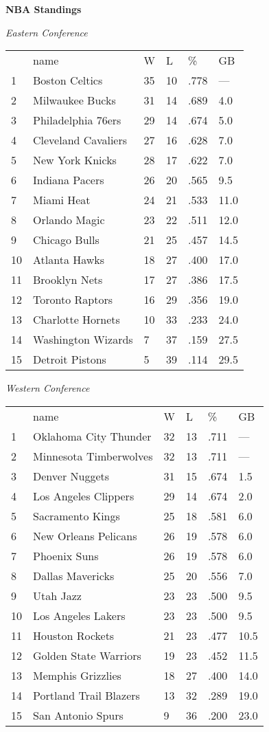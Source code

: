 \textbf{NBA Standings}

\textit{Eastern Conference}
\begin{tabular}{llllll}
 & name & W & L & \% & GB \\
1 & Boston Celtics & 35 & 10 & .778 & — \\
2 & Milwaukee Bucks & 31 & 14 & .689 & 4.0 \\
3 & Philadelphia 76ers & 29 & 14 & .674 & 5.0 \\
4 & Cleveland Cavaliers & 27 & 16 & .628 & 7.0 \\
5 & New York Knicks & 28 & 17 & .622 & 7.0 \\
6 & Indiana Pacers & 26 & 20 & .565 & 9.5 \\
7 & Miami Heat & 24 & 21 & .533 & 11.0 \\
8 & Orlando Magic & 23 & 22 & .511 & 12.0 \\
9 & Chicago Bulls & 21 & 25 & .457 & 14.5 \\
10 & Atlanta Hawks & 18 & 27 & .400 & 17.0 \\
11 & Brooklyn Nets & 17 & 27 & .386 & 17.5 \\
12 & Toronto Raptors & 16 & 29 & .356 & 19.0 \\
13 & Charlotte Hornets & 10 & 33 & .233 & 24.0 \\
14 & Washington Wizards & 7 & 37 & .159 & 27.5 \\
15 & Detroit Pistons & 5 & 39 & .114 & 29.5 \\
\end{tabular}


\textit{Western Conference}
\begin{tabular}{llllll}
 & name & W & L & \% & GB \\
1 & Oklahoma City Thunder & 32 & 13 & .711 & — \\
2 & Minnesota Timberwolves & 32 & 13 & .711 & — \\
3 & Denver Nuggets & 31 & 15 & .674 & 1.5 \\
4 & Los Angeles Clippers & 29 & 14 & .674 & 2.0 \\
5 & Sacramento Kings & 25 & 18 & .581 & 6.0 \\
6 & New Orleans Pelicans & 26 & 19 & .578 & 6.0 \\
7 & Phoenix Suns & 26 & 19 & .578 & 6.0 \\
8 & Dallas Mavericks & 25 & 20 & .556 & 7.0 \\
9 & Utah Jazz & 23 & 23 & .500 & 9.5 \\
10 & Los Angeles Lakers & 23 & 23 & .500 & 9.5 \\
11 & Houston Rockets & 21 & 23 & .477 & 10.5 \\
12 & Golden State Warriors & 19 & 23 & .452 & 11.5 \\
13 & Memphis Grizzlies & 18 & 27 & .400 & 14.0 \\
14 & Portland Trail Blazers & 13 & 32 & .289 & 19.0 \\
15 & San Antonio Spurs & 9 & 36 & .200 & 23.0 \\
\end{tabular}


